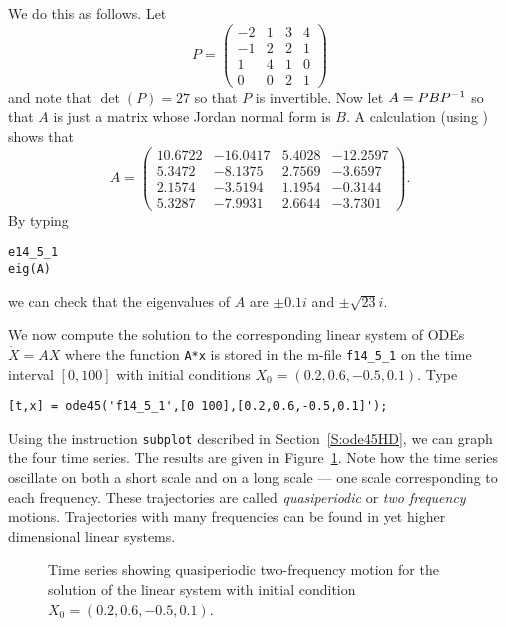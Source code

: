 \documentclass{ximera}
\begin{document}
We do this as follows.  Let
\[
P = \left(\begin{array}{rrrr}
   -2  &  1   &  3  &  4 \\
   -1  &  2   &  2  &  1 \\
    1  &  4   &  1  &  0\\
    0  &  0   &  2  &  1
\end{array}\right)
\]
and note that $\det(P)=27$ so that $P$ is invertible.  
Now let
$A=PBP^{-1}$ so that $A$ is just a matrix whose 
Jordan normal form is $B$.
A calculation (using \Matlabp) shows that
\begin{equation*}  \label{e:tor4}
A = \left(\begin{array}{rrrr}
   10.6722 &  -16.0417 &    5.4028 &  -12.2597\\
    5.3472 &   -8.1375 &    2.7569 &   -3.6597\\
    2.1574 &   -3.5194 &    1.1954 &   -0.3144\\
    5.3287 &   -7.9931 &    2.6644 &   -3.7301
\end{array}\right).
\end{equation*}
By typing
\begin{verbatim}
e14_5_1
eig(A)
\end{verbatim}
we can check that the eigenvalues of $A$ are $\pm0.1i$ and $\pm\sqrt{23}i$.

We now compute the solution to the corresponding linear system of ODEs 
$\dot{X}=AX$ where the function {\tt A*x} is stored in the m-file 
{\tt f14\_5\_1} on the time interval $[0,100]$ with 
initial conditions $X_0=(0.2,0.6,-0.5,0.1)$. Type
\begin{verbatim}
[t,x] = ode45('f14_5_1',[0 100],[0.2,0.6,-0.5,0.1]');
\end{verbatim}
Using the \Matlab instruction {\tt subplot} described in 
Section~\ref{S:ode45HD}, we can graph the four time series.
The results are given in 
Figure~\ref{F:ftor4ts}.  Note how the time series oscillate on both a short 
scale and on a long scale --- one scale corresponding to each frequency.  
These trajectories are called {\em quasiperiodic\/}
 or {\em two frequency\/} motions.
  Trajectories with many frequencies can be 
found in yet higher dimensional linear systems.


\begin{figure}[htb]
   \centerline{%
   }
   \caption{Time series showing quasiperiodic two-frequency motion for the 
	solution of the linear system \protect{} with initial 
	condition $X_0=(0.2,0.6,-0.5,0.1)$.}
   \label{F:ftor4ts}
\end{figure}
\end{document}
